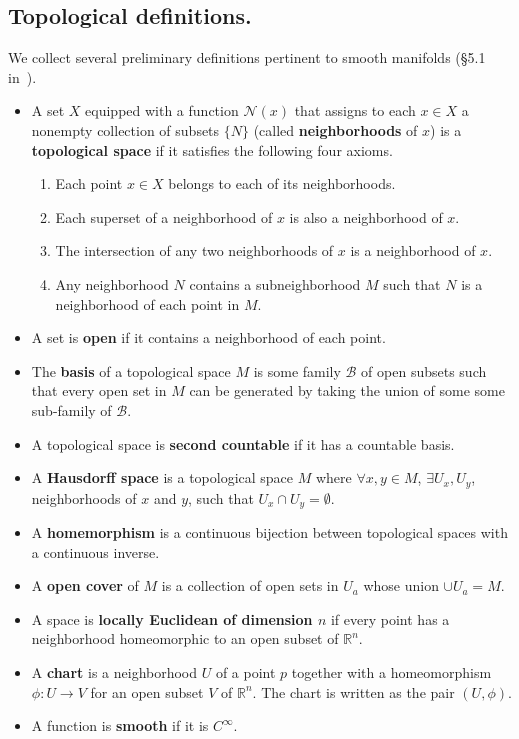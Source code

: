\documentclass[12pt]{article}
\newcommand{\R}{\mathbb{R}}
\theoremstyle{definition}
\theoremstyle{definition}
\theoremstyle{definition}
\theoremstyle{definition}
\theoremstyle{definition}
\theoremstyle{definition}
\theoremstyle{definition}
\theoremstyle{definition}
\begin{document}
\subsection{Topological definitions.}

\par{We collect several preliminary definitions
pertinent to smooth manifolds (§5.1
in~\cite{Tu}).}

\begin{itemize}[noitemsep,topsep=0pt]
\item {A set $X$ equipped with a function
$\mathcal{N}(x)$ that assigns to each $x \in X$ a
nonempty collection of subsets $\{N\}$ (called
\textbf{neighborhoods} of $x$) is a
\textbf{topological space} if it satisfies the
following four axioms.
\begin{enumerate}[noitemsep,topsep=0pt]
\item {Each point $x \in X$  belongs to each
of its neighborhoods.}
\item {Each superset of a neighborhood of $x$
is also a neighborhood of $x$.}
\item {The intersection of any two
neighborhoods of $x$ is a neighborhood of
$x$.}
\item {Any neighborhood $N$ contains a
subneighborhood $M$ such that $N$ is a
    neighborhood of each point in $M$.}
\end{enumerate}}
\item {A set is \textbf{open} if it contains a
neighborhood of each point.} 
\item {The \textbf{basis} of a topological space
$M$ is some family $\mathcal{B}$ of open subsets
such that every open set in $M$ can be generated
by taking the union of some some sub-family of
$\mathcal{B}$.}
\item {A topological space is \textbf{second countable}
if it has a countable basis.}
\item {A \textbf{Hausdorff space} is a topological
space $M$ where $\forall x, y \in M$, $\exists
U_x, U_y$, neighborhoods of $x$ and $y$, such that
$U_x \cap U_y = \emptyset$.}
\item {A \textbf{homemorphism} is a continuous
bijection between topological spaces with a
continuous inverse.}
\item {A \textbf{open cover} of $M$ is a
collection of open sets in ${U_a}$ whose union
$\cup U_a = M$.}
\item {A space is \textbf{locally Euclidean of
dimension $n$} if every point has a neighborhood
homeomorphic to an open subset of $\R^n$.}
\item {A \textbf{chart} is a neighborhood $U$ of a
point $p$ together with a homeomorphism $\phi: U
\to V$ for an open subset $V$ of $\R^n$. The chart
is written as the pair $(U, \phi)$}.
\item {A function is \textbf{smooth} if it is $C^\infty$.}
\end{itemize}
\end{document}

